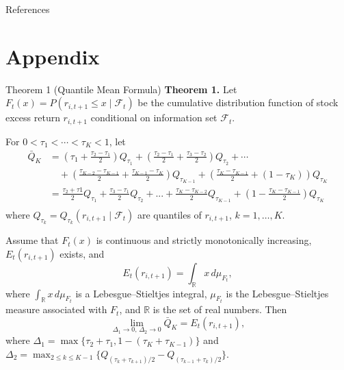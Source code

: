 \documentclass[aspectratio=169]{beamer}
\begin{document}
\begin{frame}[allowframebreaks]{References}
    \printbibliography
\end{frame}

\appendix

\section{Appendix}
\begin{frame}[allowframebreaks]{Theorem 1 (Quantile Mean Formula)}
\textbf{Theorem 1.} Let $F_t(x) = P(r_{i,t+1} \leq x \mid \mathcal{F}_t)$ be the cumulative distribution function of stock excess return $r_{i,t+1}$ conditional on information set $\mathcal{F}_t$.

For $0 < \tau_1 < \cdots < \tau_K < 1$, let
\[
\begin{aligned}
\bar{Q}_K &= (\tau_1 + \frac{\tau_2 - \tau_1}{2}) Q_{\tau_1} + (\frac{\tau_2 - \tau_1}{2} + \frac{\tau_3 - \tau_2}{2}) Q_{\tau_2} + \cdots \\
&\quad + (\frac{\tau_{K-2} - \tau_{K-1}}{2} + \frac{\tau_{K-1} - \tau_K}{2}) Q_{\tau_{K-1}} + (\frac{\tau_{K} - \tau_{K-1}}{2} + (1-\tau_K)) Q_{\tau_K} \\
&= \frac{\tau_2 + \tau 1}{2}Q_{\tau_1} + \frac{\tau_3 - \tau_1}{2} Q_{\tau_2} + ... + \frac{\tau_K - \tau_{K-2}}{2} Q_{\tau_{K-1}} + (1 - \frac{\tau_{K} - \tau_{K-1}}{2}) Q_{\tau_K} \\
\end{aligned}
\]
where $Q_{\tau_k} = Q_{\tau_k}(r_{i,t+1} \mid \mathcal{F}_t)$ are quantiles of $r_{i,t+1}$, $k = 1, \ldots, K$.

Assume that $F_t(x)$ is continuous and strictly monotonically increasing, $E_t(r_{i,t+1})$ exists, and
\[
E_t(r_{i,t+1}) = \int_{\mathbb{R}} x\, d\mu_{F_t},
\]
where $\int_{\mathbb{R}} x\, d\mu_{F_t}$ is a Lebesgue–Stieltjes integral, $\mu_{F_t}$ is the Lebesgue–Stieltjes measure associated with $F_t$, and $\mathbb{R}$ is the set of real numbers. Then
\[
\lim_{\Delta_1 \to 0,\, \Delta_2 \to 0} \bar{Q}_K = E_t(r_{i,t+1}),
\]
where $\Delta_1 = \max\{\tau_2 + \tau_1, 1 - (\tau_K + \tau_{K-1})\}$ and $\Delta_2 = \max_{2 \leq k \leq K-1} \{ Q_{(\tau_k + \tau_{k+1})/2} - Q_{(\tau_{k-1} + \tau_k)/2} \}$.
\end{frame}
\end{document}
